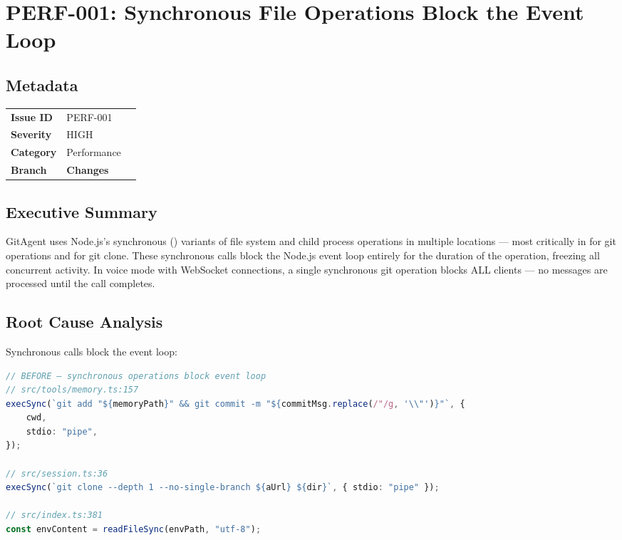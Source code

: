 \section{PERF-001: Synchronous File Operations Block the Event Loop}
\label{sec:perf-001}
\subsection*{Metadata}
\begin{tabular}{ll}
\textbf{Issue ID} & PERF-001 \\
\textbf{Severity} & HIGH \\
\textbf{Category} & Performance \\
\textbf{Branch} & 
\textbf{Changes} &  \\
\end{tabular}

\subsection*{Executive Summary}
GitAgent uses Node.js's synchronous () variants of file system and child process operations in multiple locations — most critically in  for  git operations and  for  git clone. These synchronous calls block the Node.js event loop entirely for the duration of the operation, freezing all concurrent activity. In voice mode with WebSocket connections, a single synchronous git operation blocks ALL clients — no messages are processed until the call completes.

\subsection*{Root Cause Analysis}
Synchronous calls block the event loop:

\begin{lstlisting}[language=TypeScript]
// BEFORE — synchronous operations block event loop
// src/tools/memory.ts:157
execSync(`git add "${memoryPath}" && git commit -m "${commitMsg.replace(/"/g, '\\"')}"`, {
    cwd,
    stdio: "pipe",
});

// src/session.ts:36
execSync(`git clone --depth 1 --no-single-branch ${aUrl} ${dir}`, { stdio: "pipe" });

// src/index.ts:381
const envContent = readFileSync(envPath, "utf-8");
\end{lstlisting}

